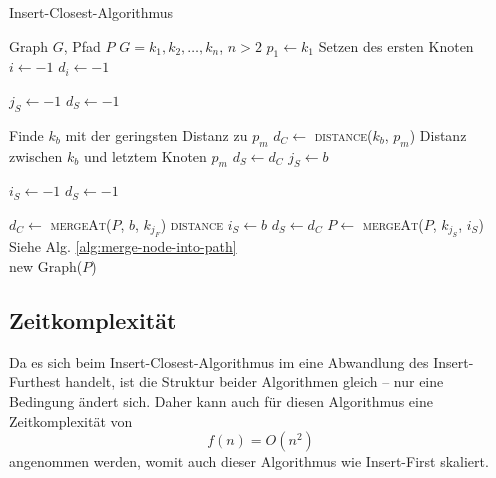 \begin{algorithm}
    \caption{Insert-Closest-Algorithmus}
    \label{alg:insert-closest}
    \begin{algorithmic}[1]
        \Require Graph $G$, Pfad $P$
        \Require $G = k_1,k_2,\ldots,k_n$, $n > 2$
        \State $p_1 \gets k_1$
        \Comment Setzen des ersten Knoten
        \State $i \gets -1$
        \State $d_i \gets -1$

            \State $j_S \gets -1$
            \State $d_S \gets -1$

                \Comment Finde $k_b$ mit der geringsten Distanz zu $p_m$
                \State $d_C \gets$ \textsc{distance}($k_b$, $p_m$)
                \Comment Distanz zwischen $k_b$ und letztem Knoten $p_m$
                    \State $d_S \gets d_C$
                    \State $j_S \gets b$
                \EndIf
            \EndFor

            \State $i_S \gets -1$
            \State $d_S \gets -1$

                \State $d_C \gets$ \textsc{mergeAt}($P$, $b$, $k_{j_F}$) \textsc{distance}
                    \State $i_S \gets b$
                    \State $d_S \gets d_C$
                \EndIf
            \EndFor
            \State $P \gets$ \textsc{mergeAt}($P$, $k_{j_S}$, $i_S$)
            \Comment Siehe Alg. \vref{alg:merge-node-into-path}
        \EndFor \\
        \Return new Graph($P$)
    \end{algorithmic}
\end{algorithm}

\subsection{Zeitkomplexität}
Da es sich beim Insert-Closest-Algorithmus im eine Abwandlung des Insert-Furthest handelt, ist die Struktur beider Algorithmen gleich -- nur eine Bedingung ändert sich.
Daher kann auch für diesen Algorithmus eine Zeitkomplexität von 
$$f(n) = O(n^2)$$ 
angenommen werden, womit auch dieser Algorithmus wie Insert-First skaliert.

